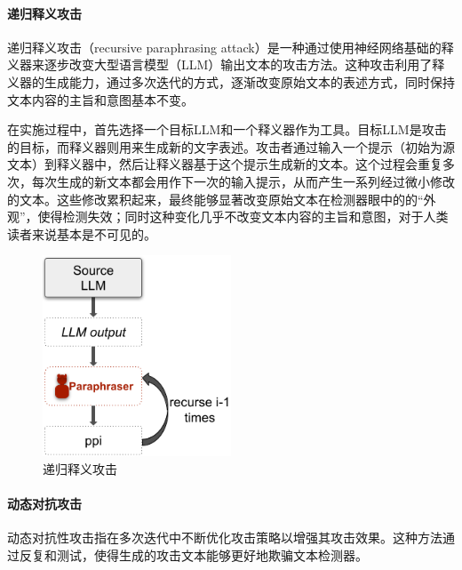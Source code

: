\documentclass[a4paper]{report}
\begin{document}
\paragraph{递归释义攻击}
递归释义攻击（recursive paraphrasing attack）是一种通过使用神经网络基础的释义器来逐步改变大型语言模型（LLM）输出文本的攻击方法。这种攻击利用了释义器的生成能力，通过多次迭代的方式，逐渐改变原始文本的表述方式，同时保持文本内容的主旨和意图基本不变。

在实施过程中，首先选择一个目标LLM和一个释义器作为工具。目标LLM是攻击的目标，而释义器则用来生成新的文字表述。攻击者通过输入一个提示（初始为源文本）到释义器中，然后让释义器基于这个提示生成新的文本。这个过程会重复多次，每次生成的新文本都会用作下一次的输入提示，从而产生一系列经过微小修改的文本。这些修改累积起来，最终能够显著改变原始文本在检测器眼中的的“外观”，使得检测失效；同时这种变化几乎不改变文本内容的主旨和意图，对于人类读者来说基本是不可见的\cite{sadasivan2023can}。
\begin{figure}[H]
	\centering
	\includegraphics[width=0.5\textwidth]{figures/递归释义攻击.png}
	\caption{递归释义攻击}
	\label{递归释义攻击}
\end{figure}

\paragraph{动态对抗攻击}
动态对抗性攻击指在多次迭代中不断优化攻击策略以增强其攻击效果。这种方法通过反复和测试，使得生成的攻击文本能够更好地欺骗文本检测器。
\end{document}
